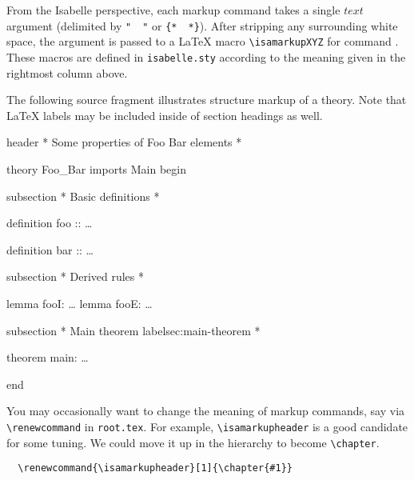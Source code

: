 \begin{isabellebody}
\begin{isamarkuptext}
  \medskip

  From the Isabelle perspective, each markup command takes a single
  $text$ argument (delimited by \verb,",~\isa{{\isasymdots}}~\verb,", or
  \verb,{,\verb,*,~\isa{{\isasymdots}}~\verb,*,\verb,},).  After stripping any
  surrounding white space, the argument is passed to a {\LaTeX} macro
  \verb,\isamarkupXYZ, for command .  These macros are
  defined in \verb,isabelle.sty, according to the meaning given in the
  rightmost column above.

  \medskip The following source fragment illustrates structure markup
  of a theory.  Note that {\LaTeX} labels may be included inside of
  section headings as well.

  \begin{ttbox}
  header {\ttlbrace}* Some properties of Foo Bar elements *{\ttrbrace}

  theory Foo_Bar
  imports Main
  begin

  subsection {\ttlbrace}* Basic definitions *{\ttrbrace}

  definition foo :: \dots

  definition bar :: \dots

  subsection {\ttlbrace}* Derived rules *{\ttrbrace}

  lemma fooI: \dots
  lemma fooE: \dots

  subsection {\ttlbrace}* Main theorem {\ttback}label{\ttlbrace}sec:main-theorem{\ttrbrace} *{\ttrbrace}

  theorem main: \dots

  end
  \end{ttbox}\vspace{-\medskipamount}

  You may occasionally want to change the meaning of markup commands,
  say via \verb,\renewcommand, in \texttt{root.tex}.  For example,
  \verb,\isamarkupheader, is a good candidate for some tuning.  We
  could move it up in the hierarchy to become \verb,\chapter,.

\begin{verbatim}
  \renewcommand{\isamarkupheader}[1]{\chapter{#1}}
\end{verbatim}


\end{isamarkuptext}
\end{isabellebody}
